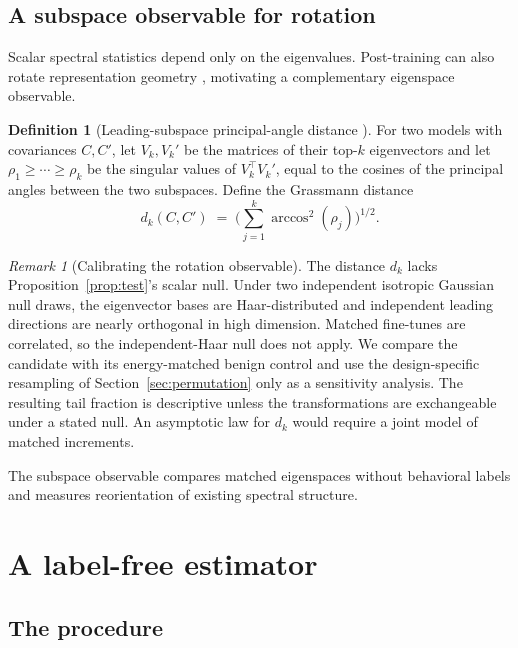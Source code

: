 \documentclass[11pt]{article}
\theoremstyle{definition}
\newtheorem{definition}[theorem]{Definition}
\theoremstyle{remark}
\newtheorem{remark}[theorem]{Remark}
\begin{document}
\subsection{A subspace observable for rotation}

Scalar spectral statistics depend only on the eigenvalues. Post-training can also rotate
representation geometry \cite{li2025geometry}, motivating a complementary eigenspace
observable.

\begin{definition}[Leading-subspace principal-angle distance
\cite{edelman1998}]
\label{def:subspace}
For two models with covariances $C, C'$, let $V_k, V_k'$ be the matrices of their top-$k$
eigenvectors and let $\rho_1 \ge \cdots \ge \rho_k$ be the singular values of $V_k^{\!\top}
V_k'$, equal to the cosines of the principal angles between the two subspaces. Define the
Grassmann distance
\[
  d_k(C, C') \;=\; \Big( \sum_{j=1}^k \arccos^2(\rho_j) \Big)^{1/2}.
\]
\end{definition}

\begin{remark}[Calibrating the rotation observable]
\label{rem:subspace}
The distance $d_k$ lacks Proposition~\ref{prop:test}'s scalar null. Under two independent
isotropic Gaussian null draws, the eigenvector bases are Haar-distributed
\cite{bai2010} and
independent leading directions are nearly orthogonal in high dimension. Matched
fine-tunes are correlated, so the independent-Haar null does not apply. We compare
the candidate with its energy-matched benign control and use the design-specific
resampling of Section~\ref{sec:permutation} only as a sensitivity analysis. The
resulting tail fraction is descriptive unless the transformations are
exchangeable under a stated null. An asymptotic law for $d_k$ would require a
joint model of matched increments.
\end{remark}

The subspace observable compares matched eigenspaces without behavioral labels and
measures reorientation of existing spectral structure.

\section{A label-free estimator}
\label{sec:estimator}

\subsection{The procedure}
\end{document}
